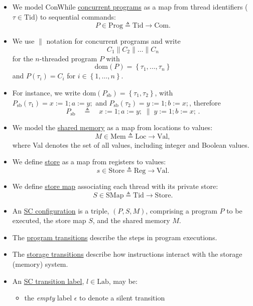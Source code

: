 \documentclass[twocolumn,landscape,10pt]{article}
\theoremstyle{definition}
\begin{document}
\begin{itemize}
    \item We model ConWhile \underline{concurrent programs} as a map 
        from thread identifiers ($\tau\in\text{Tid}$) to sequential commands:
        \[
            P\in\text{Prog}\triangleq\text{Tid}\rightarrow\text{Com}.
        \]
    \item We use $\parallel$ notation for concurrent programs and write 
        \[
            C_1\parallel C_2\parallel \ldots\parallel C_n
        \]
        for the $n$-threaded program $P$ with
        \[
            \text{dom}(P)=\left\{\tau_1,\ldots,\tau_n\right\}
        \]
        and
        $P(\tau_i)=C_i$ for $i\in\left\{1,\ldots,n\right\}$.
    \item For instance, we write
        $\text{dom}(P_{\text{sb}})=\left\{\tau_1,\tau_2\right\}$,
        with $P_{\text{sb}}(\tau_1)=x:=1;a:=y;$ and
        $P_{\text{sb}}(\tau_2)=y:=1;b:=x;$, therefore
        \[
            P_{\text{sb}}\quad\triangleq\quad
            x:=1;a:=y;\;\parallel\;y:=1;b:=x;\,.
        \]
    \item We model the \underline{shared memory} as a map from locations to
        values:
        \[
            M\in\text{Mem}\triangleq\text{Loc}\rightarrow\text{Val},
        \]
        where Val denotes the set of all values, including integer and Boolean
        values.
    \item We define \underline{store} as a map from registers to values:
        \[
            s\in\text{Store}\triangleq\text{Reg}\rightarrow\text{Val}.
        \]
    \item We define \underline{store map} associating each thread with its
        private store:
        \[
            S\in\text{SMap}\triangleq\text{Tid}\rightarrow\text{Store}.
        \]
    \item An \underline{SC configuration} is a triple, $(P,S,M)$, comprising a
        program $P$ to be executed, the store map $S$, and the shared memory
        $M$.
    \item The \underline{program transitions} describe the steps in program
        executions.
    \item The \underline{storage transitions} describe how instructions interact
        with the storage (memory) system.
    \item An \underline{SC transition label}, $l\in\text{Lab}$, may be:
        \begin{itemize}
            \item the \emph{empty} label $\epsilon$ to denote a silent transition

\end{itemize}
\end{itemize}
\end{document}
